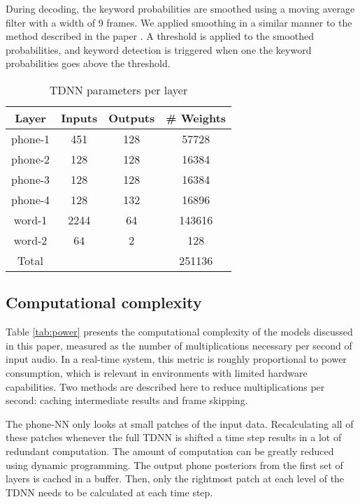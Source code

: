 \documentclass{article}
\begin{document}
During decoding, the keyword probabilities are smoothed using a moving average filter with a width of 9 frames.  We applied smoothing in a similar manner to the method described in the paper \cite{Chen14,Sainath15}.   A threshold is applied to the smoothed probabilities, and keyword detection is triggered when one the keyword probabilities goes above the threshold.

\begin{table}
\begin{center}
\begin{tabular}{|c|c|c|c| } 
\hline
Layer & Inputs & Outputs & \# Weights \\ 
\hline
phone-1 & 451 & 128 & 57728 \\ 
phone-2 & 128 & 128 & 16384 \\ 
phone-3 & 128 & 128 & 16384 \\ 
phone-4 & 128 & 132 & 16896 \\ 
word-1 & 2244 & 64 & 143616 \\ 
word-2 & 64 & 2 & 128 \\ 
\hline
Total & & & 251136 \\ 
\hline
\end{tabular}
\caption{TDNN parameters per layer}
\label{tab:arch}
\end{center}
\end{table}
 
\subsection{Computational complexity}
\label{ssec:multiplies}

Table \ref{tab:power} presents the computational complexity of the models discussed in this paper, measured as the number of multiplications necessary per second of input audio. In a real-time system, this metric is roughly proportional to power consumption, which is relevant in environments with limited hardware capabilities.  Two methods are described here to reduce multiplications per second: caching intermediate results and frame skipping.

The phone-NN only looks at small patches of the input data. Recalculating all of these patches whenever the full TDNN is shifted a time step results in a lot of redundant computation. The amount of computation can be greatly reduced using dynamic programming. The output phone posteriors from the first set of layers is cached in a buffer. Then, only the rightmost patch at each level of the TDNN needs to be calculated at each time step.
\end{document}
